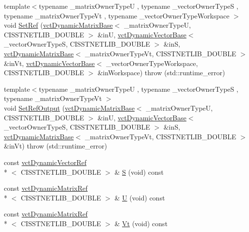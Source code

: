 \begin{DoxyCompactItemize}
{\footnotesize template$<$typename \-\_\-matrix\-Owner\-Type\-U , typename \-\_\-vector\-Owner\-Type\-S , typename \-\_\-matrix\-Owner\-Type\-Vt , typename \-\_\-vector\-Owner\-Type\-Workspace $>$ }\\void \hyperlink{classnmr_s_v_d_economy_dynamic_data_a6a565c76dcc2d1b5440d8deff372d2bc}{Set\-Ref} (\hyperlink{classvct_dynamic_matrix_base}{vct\-Dynamic\-Matrix\-Base}$<$ \-\_\-matrix\-Owner\-Type\-U, C\-I\-S\-S\-T\-N\-E\-T\-L\-I\-B\-\_\-\-D\-O\-U\-B\-L\-E $>$ \&in\-U, \hyperlink{classvct_dynamic_vector_base}{vct\-Dynamic\-Vector\-Base}$<$ \-\_\-vector\-Owner\-Type\-S, C\-I\-S\-S\-T\-N\-E\-T\-L\-I\-B\-\_\-\-D\-O\-U\-B\-L\-E $>$ \&in\-S, \hyperlink{classvct_dynamic_matrix_base}{vct\-Dynamic\-Matrix\-Base}$<$ \-\_\-matrix\-Owner\-Type\-Vt, C\-I\-S\-S\-T\-N\-E\-T\-L\-I\-B\-\_\-\-D\-O\-U\-B\-L\-E $>$ \&in\-Vt, \hyperlink{classvct_dynamic_vector_base}{vct\-Dynamic\-Vector\-Base}$<$ \-\_\-vector\-Owner\-Type\-Workspace, C\-I\-S\-S\-T\-N\-E\-T\-L\-I\-B\-\_\-\-D\-O\-U\-B\-L\-E $>$ \&in\-Workspace)  throw (std\-::runtime\-\_\-error)
\item 
{\footnotesize template$<$typename \-\_\-matrix\-Owner\-Type\-U , typename \-\_\-vector\-Owner\-Type\-S , typename \-\_\-matrix\-Owner\-Type\-Vt $>$ }\\void \hyperlink{classnmr_s_v_d_economy_dynamic_data_a006e07c4a0b8c0dcd2c1ab85d588a139}{Set\-Ref\-Output} (\hyperlink{classvct_dynamic_matrix_base}{vct\-Dynamic\-Matrix\-Base}$<$ \-\_\-matrix\-Owner\-Type\-U, C\-I\-S\-S\-T\-N\-E\-T\-L\-I\-B\-\_\-\-D\-O\-U\-B\-L\-E $>$ \&in\-U, \hyperlink{classvct_dynamic_vector_base}{vct\-Dynamic\-Vector\-Base}$<$ \-\_\-vector\-Owner\-Type\-S, C\-I\-S\-S\-T\-N\-E\-T\-L\-I\-B\-\_\-\-D\-O\-U\-B\-L\-E $>$ \&in\-S, \hyperlink{classvct_dynamic_matrix_base}{vct\-Dynamic\-Matrix\-Base}$<$ \-\_\-matrix\-Owner\-Type\-Vt, C\-I\-S\-S\-T\-N\-E\-T\-L\-I\-B\-\_\-\-D\-O\-U\-B\-L\-E $>$ \&in\-Vt)  throw (std\-::runtime\-\_\-error)
\item 
const \hyperlink{classvct_dynamic_vector_ref}{vct\-Dynamic\-Vector\-Ref}\\*
$<$ C\-I\-S\-S\-T\-N\-E\-T\-L\-I\-B\-\_\-\-D\-O\-U\-B\-L\-E $>$ \& \hyperlink{classnmr_s_v_d_economy_dynamic_data_a5326180f759203b44165d655dd9c7cc3}{S} (void) const 
\item 
const \hyperlink{classvct_dynamic_matrix_ref}{vct\-Dynamic\-Matrix\-Ref}\\*
$<$ C\-I\-S\-S\-T\-N\-E\-T\-L\-I\-B\-\_\-\-D\-O\-U\-B\-L\-E $>$ \& \hyperlink{classnmr_s_v_d_economy_dynamic_data_a9e9211a54443d529c82a2c1f8161934f}{U} (void) const 
\item 
const \hyperlink{classvct_dynamic_matrix_ref}{vct\-Dynamic\-Matrix\-Ref}\\*
$<$ C\-I\-S\-S\-T\-N\-E\-T\-L\-I\-B\-\_\-\-D\-O\-U\-B\-L\-E $>$ \& \hyperlink{classnmr_s_v_d_economy_dynamic_data_a191e18293e746bb00deec285c1bb39f8}{Vt} (void) const 
\end{DoxyCompactItemize}
